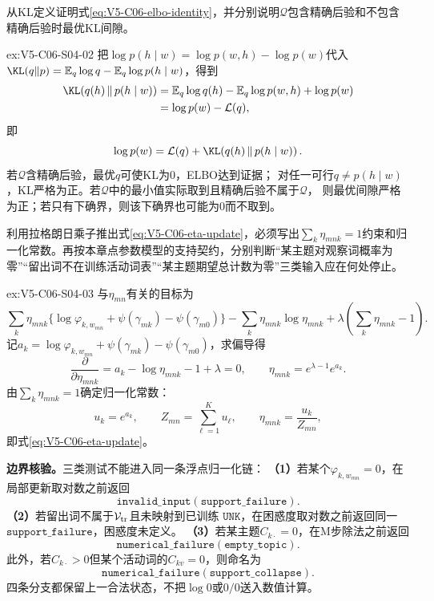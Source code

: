 \begin{SLChapterExercisePairSection}
\begin{exercise}\label{ex:V5-C06-S04-02}
从KL定义证明式\eqref{eq:V5-C06-elbo-identity}，并分别说明$\mathcal Q$包含精确后验和不包含精确后验时最优KL间隙。
\end{exercise}
\ifSLFullEdition
{}\label{sol:V5-C06-S04-02}
\begin{chapterexercisesolution}{ex:V5-C06-S04-02}
\nopagebreak[4]
把$\log p(h\mid w)=\log p(w,h)-\log p(w)$代入
$\KL(q\|p)=\mathbb E_q\log q-\mathbb E_q\log p(h\mid w)$，得到
\[
\begin{aligned}
\KL\!\left(q(h)\,\middle\|\,p(h\mid w)\right)
&=\mathbb E_q\log q(h)-\mathbb E_q\log p(w,h)+\log p(w)\\
&=\log p(w)-\mathcal L(q),
\end{aligned}
\]
即
\[
\log p(w)=\mathcal L(q)
+\KL\!\left(q(h)\,\middle\|\,p(h\mid w)\right).
\]
若$\mathcal Q$含精确后验，最优$q$可使KL为0，ELBO达到证据；
对任一可行$q\ne p(h\mid w)$，KL严格为正。若$\mathcal Q$中的最小值实际取到且精确后验不属于$\mathcal Q$，
则最优间隙严格为正；若只有下确界，则该下确界也可能为0而不取到。
\end{chapterexercisesolution}
\fi

\begin{exercise}\label{ex:V5-C06-S04-03}
利用拉格朗日乘子推出式\eqref{eq:V5-C06-eta-update}，必须写出$\sum_k\eta_{mnk}=1$约束和归一化常数。再按本章点参数模型的支持契约，分别判断“某主题对观察词概率为零”“留出词不在训练活动词表”“某主题期望总计数为零”三类输入应在何处停止。
\end{exercise}
\ifSLFullEdition
{}\label{sol:V5-C06-S04-03}
\begin{chapterexercisesolution}{ex:V5-C06-S04-03}
\nopagebreak[4]
与$\eta_{mn}$有关的目标为
\[
\sum_k\eta_{mnk}
\{\log\varphi_{k,w_{mn}}+\psi(\gamma_{mk})-\psi(\gamma_{m0})\}
-\sum_k\eta_{mnk}\log\eta_{mnk}
+\lambda(\sum_k\eta_{mnk}-1).
\]
记$a_k=\log\varphi_{k,w_{mn}}+\psi(\gamma_{mk})-\psi(\gamma_{m0})$，求偏导得
\[
\frac{\partial}{\partial\eta_{mnk}}
=a_k-\log\eta_{mnk}-1+\lambda=0,
\qquad
\eta_{mnk}=e^{\lambda-1}e^{a_k}.
\]
由$\sum_k\eta_{mnk}=1$确定归一化常数：
\[
u_k=e^{a_k},\qquad
Z_{mn}=\sum_{\ell=1}^{K}u_\ell,\qquad
\eta_{mnk}=\frac{u_k}{Z_{mn}},
\]
即式\eqref{eq:V5-C06-eta-update}。

\textbf{边界核验。}三类测试不能进入同一条浮点归一化链：
\textbf{（1）}若某个$\varphi_{k,w_{mn}}=0$，在局部更新取对数之前返回
\[
\mathtt{invalid\_input}(\mathtt{support\_failure}).
\]
\textbf{（2）}若留出词不属于$\mathcal V_{\rm tr}$且未映射到已训练
$\mathtt{UNK}$，在困惑度取对数之前返回同一
$\mathtt{support\_failure}$，困惑度未定义。
\textbf{（3）}若某主题$C_{k\cdot}=0$，在M步除法之前返回
\[
\mathtt{numerical\_failure}(\mathtt{empty\_topic}).
\]
此外，若$C_{k\cdot}>0$但某个活动词的$C_{kv}=0$，则命名为
\[
\mathtt{numerical\_failure}(\mathtt{support\_collapse}).
\]
四条分支都保留上一合法状态，不把$\log0$或$0/0$送入数值计算。
\end{chapterexercisesolution}
\fi


\end{SLChapterExercisePairSection}
